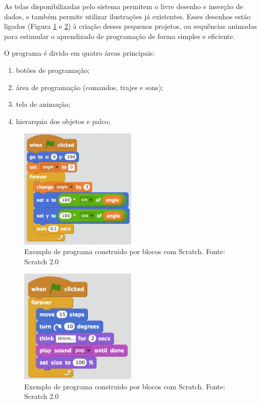 As telas disponibilizadas pelo sistema permitem o livre desenho e inserção de dados, e também permite utilizar ilustrações já existentes.
Esses desenhos estão ligados (Figura \ref{fig:scratchex1} e \ref{fig:scratchex2}) à criação desses pequenos projetos, ou
sequências animadas para estimular o aprendizado de programação de forma simples e eficiente.

O programa é divido em quatro áreas principais:
\begin{enumerate}
	\item botões de programação;
	\item área de programação (comandos, trajes e sons);
	\item tela de animação;
	\item hierarquia dos objetos e palco;
\end{enumerate}

\begin{figure}[H]
    \centering
    \includegraphics[width=0.5\textwidth]{figuras/scratch_ex1.eps}
    \caption{Exemplo de programa construido por blocos com Scratch. Fonte: Scratch 2.0}
    \label{fig:scratchex1}
\end{figure}

\begin{figure}[H]
    \centering
    \includegraphics[width=0.5\textwidth]{figuras/scratch_ex2.eps}
    \caption{Exemplo de programa construido por blocos com Scratch. Fonte: Scratch 2.0}
    \label{fig:scratchex2}
\end{figure}
